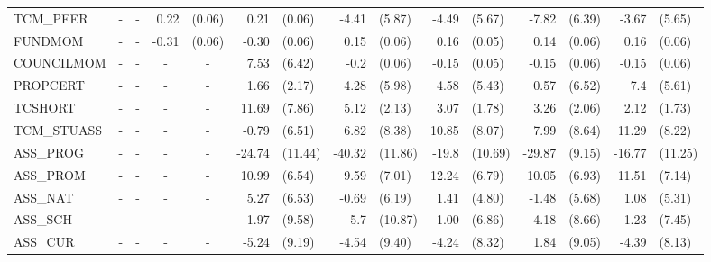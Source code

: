 \documentclass[10pt]{article}
\begin{document}
\begin{table}[htbp]
\begin{tabular}{lrlrlrlrlrlrlrl}
    TCM\_PEER & \multicolumn{1}{c}{-} & \multicolumn{1}{c}{-} & 0.22  & (0.06) & 0.21  & (0.06) & -4.41 & (5.87) & -4.49 & (5.67) & -7.82 & (6.39) & -3.67 & (5.65) \\[0.2em]
    FUNDMOM & \multicolumn{1}{c}{-} & \multicolumn{1}{c}{-} & -0.31 & (0.06) & -0.30 & (0.06) & 0.15  & (0.06) & 0.16  & (0.05) & 0.14  & (0.06) & 0.16  & (0.06) \\[0.2em]
    COUNCILMOM & \multicolumn{1}{c}{-} & \multicolumn{1}{c}{-} & \multicolumn{1}{c}{-} & \multicolumn{1}{c}{-} & 7.53  & (6.42) & -0.2  & (0.06) & -0.15 & (0.05) & -0.15 & (0.06) & -0.15 & (0.06) \\[0.2em]
    PROPCERT & \multicolumn{1}{c}{-} & \multicolumn{1}{c}{-} & \multicolumn{1}{c}{-} & \multicolumn{1}{c}{-} & 1.66  & (2.17) & 4.28  & (5.98) & 4.58  & (5.43) & 0.57  & (6.52) & 7.4   & (5.61) \\[0.2em]
    TCSHORT & \multicolumn{1}{c}{-} & \multicolumn{1}{c}{-} & \multicolumn{1}{c}{-} & \multicolumn{1}{c}{-} & 11.69 & (7.86) & 5.12  & (2.13) & 3.07  & (1.78) & 3.26  & (2.06) & 2.12  & (1.73) \\[0.2em]
    TCM\_STUASS & \multicolumn{1}{c}{-} & \multicolumn{1}{c}{-} & \multicolumn{1}{c}{-} & \multicolumn{1}{c}{-} & -0.79 & (6.51) & 6.82  & (8.38) & 10.85 & (8.07) & 7.99  & (8.64) & 11.29 & (8.22) \\[0.2em]
    ASS\_PROG & \multicolumn{1}{c}{-} & \multicolumn{1}{c}{-} & \multicolumn{1}{c}{-} & \multicolumn{1}{c}{-} & -24.74 & (11.44) & -40.32 & (11.86) & -19.8 & (10.69) & -29.87 & (9.15) & -16.77 & (11.25) \\[0.2em]
    ASS\_PROM & \multicolumn{1}{c}{-} & \multicolumn{1}{c}{-} & \multicolumn{1}{c}{-} & \multicolumn{1}{c}{-} & 10.99 & (6.54) & 9.59  & (7.01) & 12.24 & (6.79) & 10.05 & (6.93) & 11.51 & (7.14) \\[0.2em]
    ASS\_NAT & \multicolumn{1}{c}{-} & \multicolumn{1}{c}{-} & \multicolumn{1}{c}{-} & \multicolumn{1}{c}{-} & 5.27  & (6.53) & -0.69 & (6.19) & 1.41  & (4.80) & -1.48 & (5.68) & 1.08  & (5.31) \\[0.2em]
    ASS\_SCH & \multicolumn{1}{c}{-} & \multicolumn{1}{c}{-} & \multicolumn{1}{c}{-} & \multicolumn{1}{c}{-} & 1.97  & (9.58) & -5.7  & (10.87) & 1.00  & (6.86) & -4.18 & (8.66) & 1.23  & (7.45) \\[0.2em]
    ASS\_CUR & \multicolumn{1}{c}{-} & \multicolumn{1}{c}{-} & \multicolumn{1}{c}{-} & \multicolumn{1}{c}{-} & -5.24 & (9.19) & -4.54 & (9.40) & -4.24 & (8.32) & 1.84  & (9.05) & -4.39 & (8.13) \\[0.2em]

\end{tabular}
\end{table}
\end{document}

